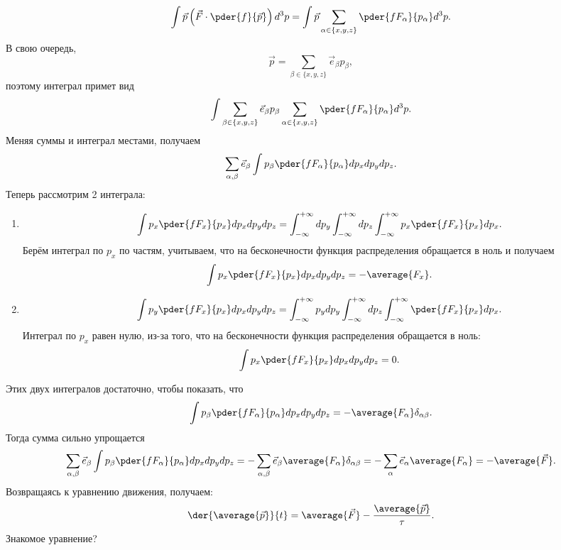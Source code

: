 \[
    \int\vec{p}\left(\vec{F}\cdot\pder{f}{\vec{p}}\right)d^3p =
    \int\vec{p}\sum_{\alpha\in\{x,y,z\}}\pder{fF_\alpha}{p_\alpha}d^3p.
\]
В свою очередь,
\[
    \vec{p} = \sum_{\beta\in\{x,y,z\}}\vec{e}_\beta p_\beta,
\]
поэтому интеграл примет вид
\[
    \int\sum_{\beta\in\{x,y,z\}}\vec{e}_\beta p_\beta
    \sum_{\alpha\in\{x,y,z\}}\pder{fF_\alpha}{p_\alpha}d^3p.
\]
Меняя суммы и интеграл местами, получаем
\[
    \sum_{\alpha,\beta}\vec{e}_\beta \int p_\beta \pder{fF_\alpha}{p_\alpha}
    dp_xdp_ydp_z.
\]
Теперь рассмотрим 2 интеграла:
\begin{enumerate}
    \item
            \[
                \int p_x \pder{fF_x}{p_x} dp_xdp_ydp_z =
                \int_{-\infty}^{+\infty} dp_y
                \int_{-\infty}^{+\infty} dp_z
                \int_{-\infty}^{+\infty} p_x \pder{fF_x}{p_x} dp_x.
            \]
            Берём интеграл по \( p_x \) по частям, учитываем, что на
            бесконечности функция распределения обращается в ноль и получаем
            \[
                \int p_x \pder{fF_x}{p_x} dp_xdp_ydp_z = -\average{F_x}.
            \]
    \item
            \[
                \int p_y \pder{fF_x}{p_x} dp_xdp_ydp_z =
                \int_{-\infty}^{+\infty} p_y dp_y
                \int_{-\infty}^{+\infty} dp_z
                \int_{-\infty}^{+\infty} \pder{fF_x}{p_x} dp_x.
            \]
            Интеграл по \( p_x \) равен нулю, из-за того, что на
            бесконечности функция распределения обращается в ноль:
            \[
                \int p_x \pder{fF_x}{p_x} dp_xdp_ydp_z = 0.
            \]
\end{enumerate}
Этих двух интегралов достаточно, чтобы показать, что
\[
    \int p_\beta \pder{fF_\alpha}{p_\alpha} dp_xdp_ydp_z =
    -\average{F_\alpha} \delta_{\alpha\beta}.
\]
Тогда сумма сильно упрощается
\[
    \sum_{\alpha,\beta}\vec{e}_\beta \int p_\beta \pder{fF_\alpha}{p_\alpha}
    dp_xdp_ydp_z =
    - \sum_{\alpha,\beta}\vec{e}_\beta \average{F_\alpha} \delta_{\alpha\beta} =
    - \sum_{\alpha}\vec{e}_\alpha \average{F_\alpha} = -\average{\vec{F}}.
\]
Возвращаясь к уравнению движения, получаем:
\[
    \der{\average{\vec{p}}}{t} = \average{\vec{F}}
    -\frac{\average{\vec{p}}}{\tau}.
\]
Знакомое уравнение?
